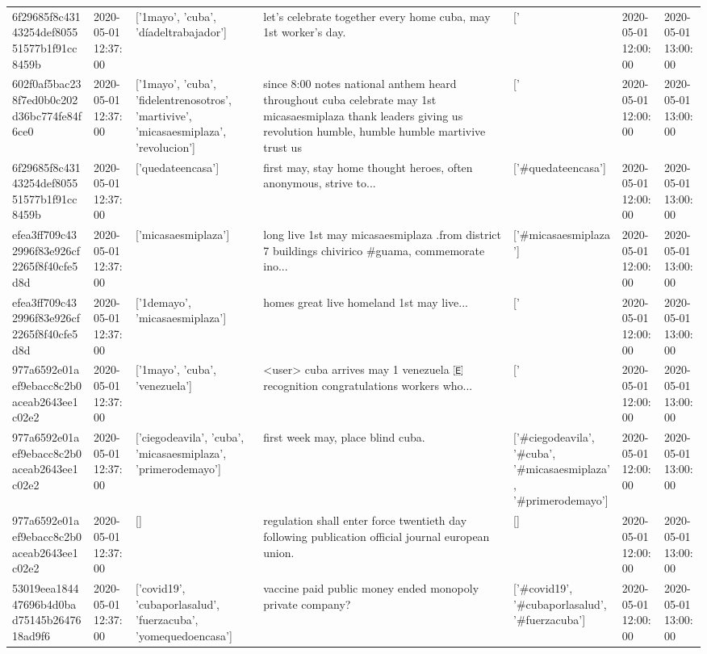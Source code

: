 \begin{tabular}{lllllll}
6f29685f8c43143254def805551577b1f91cc8459b & 2020-05-01 12:37:00 & ['1mayo', 'cuba', 'díadeltrabajador'] & let's celebrate together every home cuba, may 1st worker's day. & ['#1mayo', '#cuba', '#díadeltrabajador'] & 2020-05-01 12:00:00 & 2020-05-01 13:00:00 \\
602f0af5bac238f7ed0b0c202d36bc774fe84f6ce0 & 2020-05-01 12:37:00 & ['1mayo', 'cuba', 'fidelentrenosotros', 'martivive', 'micasaesmiplaza', 'revolucion'] & since 8:00 notes national anthem heard throughout cuba celebrate may 1st micasaesmiplaza thank leaders giving us revolution humble, humble humble martivive trust us & ['#1mayo', '#cuba', '#micasaesmiplaza', '#revolucion'] & 2020-05-01 12:00:00 & 2020-05-01 13:00:00 \\
6f29685f8c43143254def805551577b1f91cc8459b & 2020-05-01 12:37:00 & ['quedateencasa'] & first may, stay home thought heroes, often anonymous, strive to... & ['#quedateencasa'] & 2020-05-01 12:00:00 & 2020-05-01 13:00:00 \\
efea3ff709c432996f83e926cf2265f8f40cfe5d8d & 2020-05-01 12:37:00 & ['micasaesmiplaza'] & long live 1st may micasaesmiplaza .from district 7 buildings chivirico \#guama, commemorate ino... & ['#micasaesmiplaza'] & 2020-05-01 12:00:00 & 2020-05-01 13:00:00 \\
efea3ff709c432996f83e926cf2265f8f40cfe5d8d & 2020-05-01 12:37:00 & ['1demayo', 'micasaesmiplaza'] & homes great live homeland 1st may live... & ['#1demayo', '#micasaesmiplaza'] & 2020-05-01 12:00:00 & 2020-05-01 13:00:00 \\
977a6592e01aef9ebacc8c2b0aceab2643ee1c02e2 & 2020-05-01 12:37:00 & ['1mayo', 'cuba', 'venezuela'] & <user> cuba arrives may 1 venezuela 🇪 recognition congratulations workers who... & ['#1mayo', '#cuba', '#venezuela'] & 2020-05-01 12:00:00 & 2020-05-01 13:00:00 \\
977a6592e01aef9ebacc8c2b0aceab2643ee1c02e2 & 2020-05-01 12:37:00 & ['ciegodeavila', 'cuba', 'micasaesmiplaza', 'primerodemayo'] & first week may, place blind cuba. & ['#ciegodeavila', '#cuba', '#micasaesmiplaza', '#primerodemayo'] & 2020-05-01 12:00:00 & 2020-05-01 13:00:00 \\
977a6592e01aef9ebacc8c2b0aceab2643ee1c02e2 & 2020-05-01 12:37:00 & [] & regulation shall enter force twentieth day following publication official journal european union. & [] & 2020-05-01 12:00:00 & 2020-05-01 13:00:00 \\
53019eea184447696b4d0bad75145b2647618ad9f6 & 2020-05-01 12:37:00 & ['covid19', 'cubaporlasalud', 'fuerzacuba', 'yomequedoencasa'] & vaccine paid public money ended monopoly private company? & ['#covid19', '#cubaporlasalud', '#fuerzacuba'] & 2020-05-01 12:00:00 & 2020-05-01 13:00:00 \\

\end{tabular}
